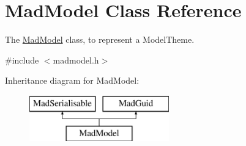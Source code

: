 \hypertarget{class_mad_model}{\section{Mad\-Model Class Reference}
\label{class_mad_model}
}


The \hyperlink{class_mad_model}{Mad\-Model} class, to represent a Model\-Theme.  




{\ttfamily \#include $<$madmodel.\-h$>$}

Inheritance diagram for Mad\-Model\-:\begin{figure}[H]
\begin{center}
\leavevmode
\includegraphics[height=2.000000cm]{class_mad_model}
\end{center}
\end{figure}
